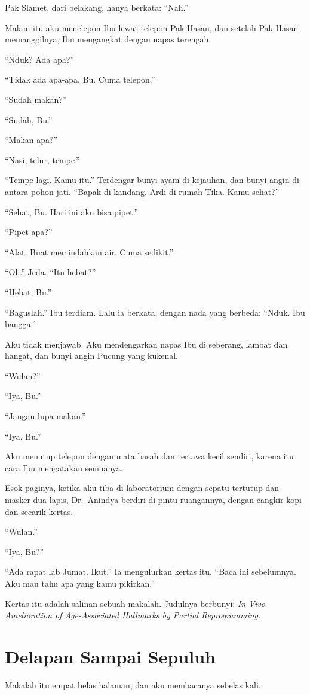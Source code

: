 \documentclass[11pt,twoside,openany]{book}
\makeatletter
\newcommand{\scenebreak}{\par\vspace{0.9em}{\centering\textsc{*\hspace{0.7em}*\hspace{0.7em}*}\par}\vspace{0.9em}\@afterindentfalse\@afterheading}
\makeatother
\begin{document}
Pak Slamet, dari belakang, hanya berkata: ``Nah.''

\scenebreak
Malam itu aku menelepon Ibu lewat telepon Pak Hasan, dan setelah Pak Hasan memanggilnya, Ibu mengangkat dengan napas terengah.

``Nduk? Ada apa?''

``Tidak ada apa-apa, Bu. Cuma telepon.''

``Sudah makan?''

``Sudah, Bu.''

``Makan apa?''

``Nasi, telur, tempe.''

``Tempe lagi. Kamu itu.'' Terdengar bunyi ayam di kejauhan, dan bunyi angin di antara pohon jati. ``Bapak di kandang. Ardi di rumah Tika. Kamu sehat?''

``Sehat, Bu. Hari ini aku bisa pipet.''

``Pipet apa?''

``Alat. Buat memindahkan air. Cuma sedikit.''

``Oh.'' Jeda. ``Itu hebat?''

``Hebat, Bu.''

``Baguslah.'' Ibu terdiam. Lalu ia berkata, dengan nada yang berbeda: ``Nduk. Ibu bangga.''

Aku tidak menjawab. Aku mendengarkan napas Ibu di seberang, lambat dan hangat, dan bunyi angin Pucung yang kukenal.

``Wulan?''

``Iya, Bu.''

``Jangan lupa makan.''

``Iya, Bu.''

Aku menutup telepon dengan mata basah dan tertawa kecil sendiri, karena itu cara Ibu mengatakan semuanya.

Esok paginya, ketika aku tiba di laboratorium dengan sepatu tertutup dan masker dua lapis, Dr.~Anindya berdiri di pintu ruangannya, dengan cangkir kopi dan secarik kertas.

``Wulan.''

``Iya, Bu?''

``Ada rapat lab Jumat. Ikut.'' Ia mengulurkan kertas itu. ``Baca ini sebelumnya. Aku mau tahu apa yang kamu pikirkan.''

Kertas itu adalah salinan sebuah makalah. Judulnya berbunyi: \emph{In Vivo Amelioration of Age-Associated Hallmarks by Partial Reprogramming.}

\chapter{Delapan Sampai Sepuluh}
Makalah itu empat belas halaman, dan aku membacanya sebelas kali.
\end{document}
